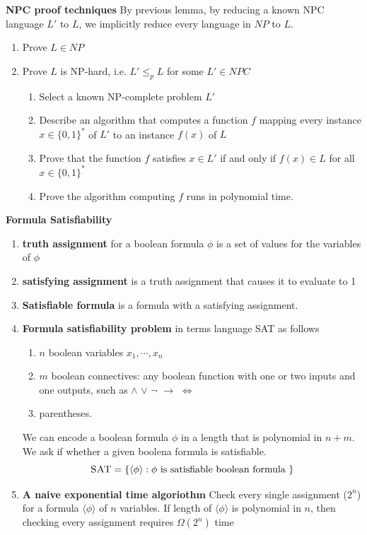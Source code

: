 \documentclass[11pt]{article}
\begin{document}
\begin{defn*}
    \textbf{NPC proof techniques} By previous lemma, by reducing a known NPC language $L'$ to $L$, we implicitly reduce every language in $NP$ to $L$. 
    \begin{enumerate}
        \item Prove $L\in NP$
        \item Prove $L$ is NP-hard, i.e. $L' \leq_p L$ for some $L' \in NPC$
        \begin{enumerate}
            \item Select a known NP-complete problem $L'$
            \item Describe an algorithm that computes a function $f$ mapping every instance $x\in \{0,1\}^*$ of $L'$ to an instance $f(x)$ of $L$
            \item Prove that the function $f$ satisfies $x\in L'$ if and only if $f(x)\in L$ for all $x\in \{0,1\}^*$
            \item Prove the algorithm computing $f$ runs in polynomial time.
        \end{enumerate}
    \end{enumerate}
\end{defn*}

\begin{defn*}
    \textbf{Formula Satisfiability} 
    \begin{enumerate}
        \item \textbf{truth assignment} for a boolean formula $\phi$ is a set of values for the variables of $\phi$ 
        \item \textbf{satisfying assignment} is a truth assignment that causes it to evaluate to 1
        \item \textbf{Satisfiable formula} is a formula with a satisfying assignment. 
        \item \textbf{Formula satisfiability problem} in terms language \textsc{SAT} as follows 
        \begin{enumerate}
            \item $n$ boolean variables $x_1, \cdots, x_n$ 
            \item $m$ boolean connectives: any boolean function with one or two inputs and one outputs, such as $\land$ $\lor$ $\neg$ $\to$ $\iff$ 
            \item parentheses.
        \end{enumerate} 
        We can encode a boolean formula $\phi$ in a length that is polynomial in $n+m$. We ask if whether a given boolena formula is satisfiable. 
        \[
            \textsc{SAT} = \{\langle \phi \rangle : \phi \text{ is satisfiable boolean formula }  \}
        \]
        \item \textbf{A naive exponential time algoriothm} Check every single assignment ($2^n$) for a formula $\langle \phi \rangle$ of $n$ variables. If length of $\langle \phi \rangle$ is polynomial in $n$, then checking every assignment requires $\Omega(2^n)$ time
    \end{enumerate}
\end{defn*}
\end{document}
